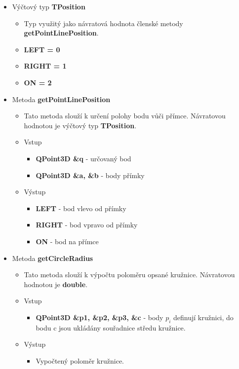 \documentclass[a4paper, 12pt]{article}
\begin{document}
\begin{itemize}

	\item Výčtový typ \textbf{TPosition}
		\begin{itemize}
			\item Typ využitý jako návratová hodnota členské metody \textbf{getPointLinePosition}.
			\item \textbf{LEFT = 0}
			\item \textbf{RIGHT = 1}
			\item \textbf{ON = 2}
		\end{itemize}

	\item Metoda \textbf{getPointLinePosition}
		\begin{itemize}
			\item Tato metoda slouží k určení polohy bodu vůči přímce. Návratovou hodnotou je výčtový typ \textbf{TPosition}.
			\item Vstup
				\begin{itemize}
					\item \textbf{QPoint3D \&q} - určovaný bod
					\item \textbf{QPoint3D \&a, \&b} - body přímky
				\end{itemize}
			\item Výstup
				\begin{itemize}
					\item \textbf{LEFT} - bod vlevo od přímky
					\item \textbf{RIGHT} - bod vpravo od přímky
					\item \textbf{ON} - bod na přímce
				\end{itemize}

		\end{itemize}


	\item Metoda \textbf{getCircleRadius}
		\begin{itemize}
			\item Tato metoda slouží k výpočtu poloměru opsané kružnice. Návratovou hodnotou je \textbf{double}.
			\item Vstup
				\begin{itemize}
					\item \textbf{QPoint3D \&p1, \&p2, \&p3, \&c} - body $p_i$ definují kružnici, do bodu c jsou ukládány souřadnice středu kružnice.
				\end{itemize}
			\item Výstup
				\begin{itemize}	
					\item Vypočtený poloměr kružnice.
				\end{itemize}
		\end{itemize}	
		

\end{itemize}
\end{document}
